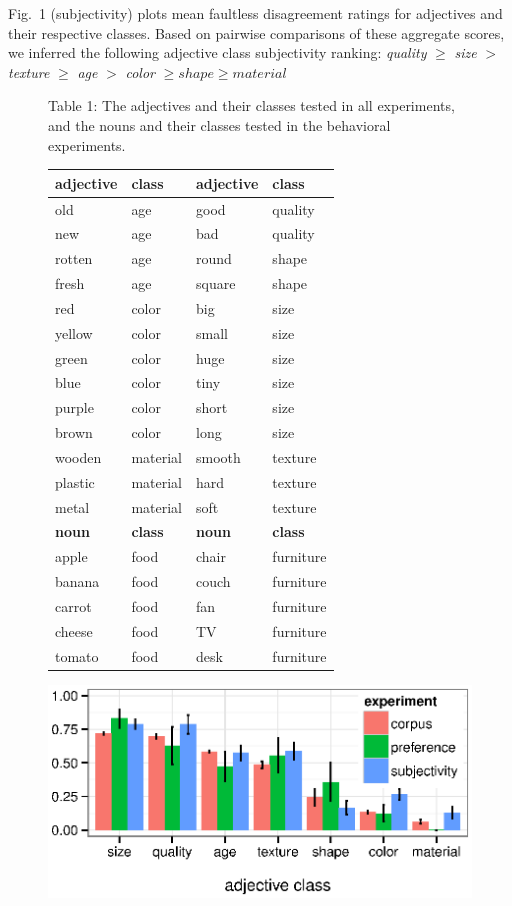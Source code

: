\documentclass[12pt]{article}
\begin{document}
Fig.~1 (subjectivity) plots mean faultless disagreement ratings for adjectives and their respective classes. Based on pairwise comparisons of these aggregate scores, we inferred the following adjective class subjectivity ranking: 	\emph{quality} $\geq$ \emph{size} $>$ \emph{texture} $\geq$ \emph{age} $>$ \emph{color}
	$\geq shape \geq material$
\begin{figure}
	Table 1: The adjectives and their classes tested in all experiments, and the nouns and their classes tested in the behavioral experiments. \\
	{\footnotesize \begin{tabular}{llll}
		\textbf{adjective}	&	\textbf{class}	&	\textbf{adjective}	&	\textbf{class}	\\ \hline
		old	&	age	&	good	&	quality	\\
		new	&	age	&	bad	&	quality	\\
		rotten	&	age	&	round	&	shape	\\
		fresh	&	age	&	square	&	shape	\\
		red	&	color	&	big	&	size	\\
		yellow	&	color	&	small	&	size	\\
		green	&	color	&	huge	&	size	\\
		blue	&	color	&	tiny	&	size	\\
		purple	&	color	&	short	&	size	\\
		brown	&	color	&	long	&	size	\\
		wooden	&	material	&	smooth	&	texture	\\
		plastic	&	material	&	hard	&	texture	\\
		metal	&	material	&	soft	&	texture	\\
		\textbf{noun}	&	\textbf{class}	&	\textbf{noun}	&	\textbf{class}	\\ \hline
		apple	&	food	&	chair	&	furniture	\\
		banana	&	food	&	couch	&	furniture	\\
		carrot	&	food	&	fan	&	furniture	\\
		cheese	&	food	&	TV	&	furniture	\\
		tomato	&	food	&	desk	&	furniture	
	\end{tabular}}
	\vspace{-15pt}
	\begin{center}
		\includegraphics[width=.95\linewidth]{plots/expt_results.eps}

\end{center}
\end{figure}
\end{document}
